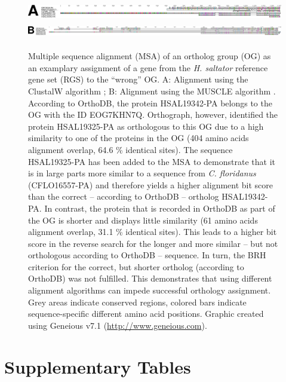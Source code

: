 \newpage

\begin{figure}
\includegraphics[height=2em]{figures/alignment-clustalw.pdf}\\
\includegraphics[height=2em]{figures/alignment-muscle.pdf}
\caption[Multiple sequence alignments of an ortholog group]{%
Multiple sequence alignment (MSA) of an ortholog group (OG) as an
examplary assignment of a gene from the \emph{H. saltator} reference
gene set (RGS) to the ``wrong'' OG.  A: Alignment using the ClustalW
algorithm \citep{Thompson1994}; B: Alignment using the MUSCLE algorithm
\citep{Edgar2004}.  According to OrthoDB, the protein HSAL19342-PA
belongs to the OG with the ID EOG7KHN7Q.  Orthograph, however,
identified the protein HSAL19325-PA as orthologous to this OG due to a
high similarity to one of the proteins in the OG (404 amino acids
alignment overlap, 64.6 \% identical sites).  The sequence HSAL19325-PA
has been added to the MSA to demonstrate that it is in large parts more
similar to a sequence from \emph{C. floridanus} (CFLO16557-PA) and
therefore yields a higher alignment bit score than the correct --
according to OrthoDB -- ortholog HSAL19342-PA.  In contrast, the protein
that is recorded in OrthoDB as part of the OG is shorter and displays
little similarity (61 amino acids alignment overlap, 31.1 \% identical
sites).  This leads to a higher bit score in the reverse search for the
longer and more similar -- but not orthologous according to OrthoDB --
sequence.  In turn, the BRH criterion for the correct, but shorter
ortholog (according to OrthoDB) was not fulfilled.  This demonstrates
that using different alignment algorithms can impede successful
orthology assignment.  Grey areas indicate conserved regions, colored
bars indicate sequence-specific different amino acid positions.  Graphic
created using Geneious v7.1 (\url{http://www.geneious.com}).}%
\label{fig:orthodb-alignments}
\end{figure}

\clearpage

\section{Supplementary Tables}

